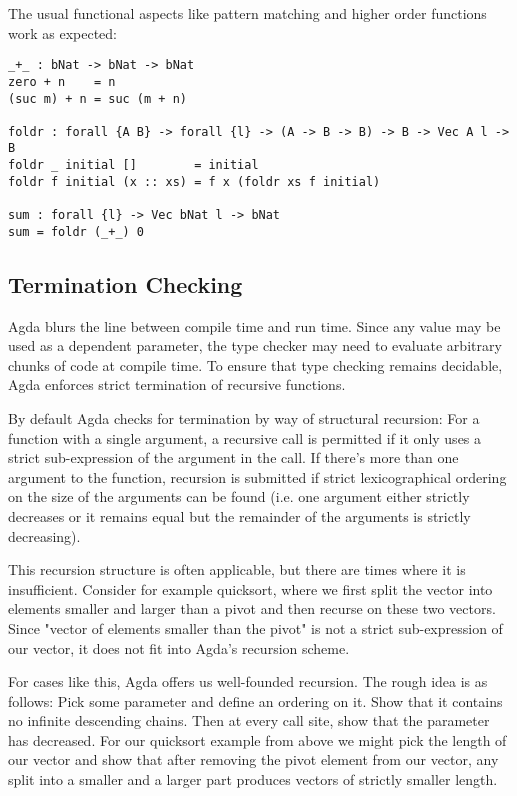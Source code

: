 The usual functional aspects like pattern matching and higher order functions work as expected:

\begin{lstlisting}[caption={Functions},label={lst:tutorial:functional},emph={foldr,sum}]
_+_ : bNat -> bNat -> bNat
zero + n    = n
(suc m) + n = suc (m + n)

foldr : forall {A B} -> forall {l} -> (A -> B -> B) -> B -> Vec A l -> B
foldr _ initial []        = initial
foldr f initial (x :: xs) = f x (foldr xs f initial)

sum : forall {l} -> Vec bNat l -> bNat
sum = foldr (_+_) 0
\end{lstlisting}

\subsection{Termination Checking}
Agda blurs the line between compile time and run time. Since any value may be used as a dependent parameter, the type checker may need to evaluate arbitrary chunks of code at compile time. To ensure that type checking remains decidable, Agda enforces strict termination of recursive functions.

By default Agda checks for termination by way of structural recursion: For a function with a single argument, a recursive call is permitted if it only uses a strict sub-expression of the argument in the call. If there's more than one argument to the function, recursion is submitted if strict lexicographical ordering on the size of the arguments can be found (i.e. one argument either strictly decreases or it remains equal but the remainder of the arguments is strictly decreasing).

This recursion structure is often applicable, but there are times where it is insufficient. Consider for example quicksort, where we first split the vector into elements smaller and larger than a pivot and then recurse on these two vectors. Since "vector of elements smaller than the pivot" is not a strict sub-expression of our vector, it does not fit into Agda's recursion scheme.

For cases like this, Agda offers us well-founded recursion. The rough idea is as follows: Pick some parameter and define an ordering on it. Show that it contains no infinite descending chains. Then at every call site, show that the parameter has decreased. For our quicksort example from above we might pick the length of our vector and show that after removing the pivot element from our vector, any split into a smaller and a larger part produces vectors of strictly smaller length.

